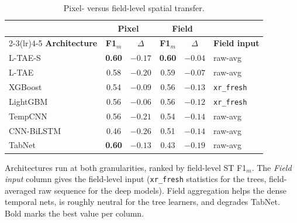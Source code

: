 \documentclass[preprint,authoryear]{elsarticle}
\begin{document}
\begin{table}[!t]
\centering
\caption{Pixel- versus field-level spatial transfer.}
\label{tab:pixfield}
\renewcommand{\arraystretch}{1.1}
\setlength{\tabcolsep}{3.5pt}
\footnotesize
\begin{tabular}{lccccl}
\toprule
 & \multicolumn{2}{c}{\textbf{Pixel}} & \multicolumn{2}{c}{\textbf{Field}} & \\
\cmidrule(lr){2-3}\cmidrule(lr){4-5}
\textbf{Architecture} & \textbf{F1$_m$} & \textbf{$\Delta$} & \textbf{F1$_m$} & \textbf{$\Delta$} & \textbf{Field input} \\
\midrule
L-TAE-S    & \textbf{0.60} & $-0.17$         & \textbf{0.60} & $\mathbf{-0.04}$ & raw-avg \\
L-TAE      & 0.58          & $-0.20$         & 0.59          & $-0.07$         & raw-avg \\
XGBoost    & 0.54          & $-0.09$         & 0.56          & $-0.13$         & \texttt{xr\_fresh} \\
LightGBM   & 0.56          & $\mathbf{-0.06}$ & 0.56          & $-0.12$         & \texttt{xr\_fresh} \\
TempCNN    & 0.56          & $-0.21$         & 0.54          & $-0.14$         & raw-avg \\
CNN-BiLSTM & 0.46          & $-0.26$         & 0.51          & $-0.14$         & raw-avg \\
TabNet     & \textbf{0.60} & $-0.13$         & 0.43          & $-0.19$         & raw-avg \\
\bottomrule
\end{tabular}
\par\vspace{3pt}
\begin{minipage}{\linewidth}
\footnotesize
Architectures run at both granularities, ranked by field-level ST F1$_m$. The \emph{Field input} column gives the field-level input (\texttt{xr\_fresh} statistics for the trees, field-averaged raw sequence for the deep models). Field aggregation helps the dense temporal nets, is roughly neutral for the tree learners, and degrades TabNet. Bold marks the best value per column.
\end{minipage}
\end{table}
\end{document}
